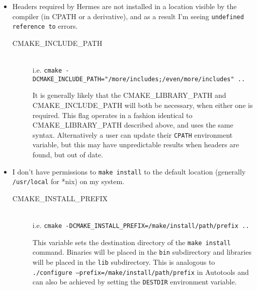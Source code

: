 \documentclass[11pt]{article}
\begin{document}
\begin{itemize}
  \item Headers required by Hermes are not installed in a location visible by the compiler (in CPATH or a derivative), and as a result I'm seeing {\tt undefined reference to} errors.
  \begin{description}
    \item[CMAKE\_INCLUDE\_PATH] \hfill \\
      i.e. {\tt cmake -DCMAKE\_INCLUDE\_PATH="/more/includes;/even/more/includes" ..} \hfill \\
      \begin{spacing}{.5}
      \end{spacing}
        It is generally likely that the CMAKE\_LIBRARY\_PATH and CMAKE\_INCLUDE\_PATH will both be necessary, when either one is required. This flag operates in a fashion identical to CMAKE\_LIBRARY\_PATH described above, and uses the same syntax. Alternatively a user can update their {\tt CPATH} environment variable, but this may have unpredictable results when headers are found, but out of date.
  \end{description}

  \item I don't have permissions to {\tt make install} to the default location (generally {\tt /usr/local} for *nix) on my system.
  \begin{description}
    \item[CMAKE\_INSTALL\_PREFIX] \hfill \\
      i.e. {\tt cmake -DCMAKE\_INSTALL\_PREFIX=/make/install/path/prefix ..} \hfill \\
      \begin{spacing}{.5}
      \end{spacing}
        This variable sets the destination directory of the {\tt make install} command. Binaries will be placed in the {\tt bin} subdirectory and libraries will be placed in the {\tt lib} subdirectory. This is analogous to {\tt ./configure --prefix=/make/install/path/prefix} in Autotools and can also be achieved by setting the {\tt DESTDIR} environment variable.
  \end{description}
\end{itemize}


\end{document}
